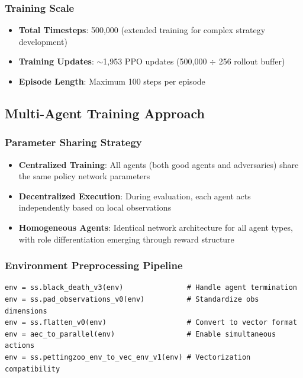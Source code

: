\subsubsection{Training Scale}
\begin{itemize}
    \item \textbf{Total Timesteps}: 500,000 (extended training for complex strategy development)
    \item \textbf{Training Updates}: $\sim$1,953 PPO updates (500,000 $\div$ 256 rollout buffer)
    \item \textbf{Episode Length}: Maximum 100 steps per episode
\end{itemize}

\subsection{Multi-Agent Training Approach}

\subsubsection{Parameter Sharing Strategy}
\begin{itemize}
    \item \textbf{Centralized Training}: All agents (both good agents and adversaries) share the same policy network parameters
    \item \textbf{Decentralized Execution}: During evaluation, each agent acts independently based on local observations
    \item \textbf{Homogeneous Agents}: Identical network architecture for all agent types, with role differentiation emerging through reward structure
\end{itemize}

\subsubsection{Environment Preprocessing Pipeline}

\begin{verbatim}
env = ss.black_death_v3(env)               # Handle agent termination
env = ss.pad_observations_v0(env)          # Standardize obs dimensions
env = ss.flatten_v0(env)                   # Convert to vector format
env = aec_to_parallel(env)                 # Enable simultaneous actions
env = ss.pettingzoo_env_to_vec_env_v1(env) # Vectorization compatibility
\end{verbatim}

